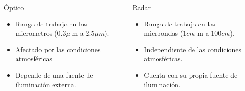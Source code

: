 \begin{frame}{} \vskip0cm
\begin{columns}
  \begin{column}{0.5\textwidth}
   \begin{block}{Óptico}
     \begin{itemize}
       \item Rango de trabajo en los micrometros ($0.3\mu$ m a $2.5\mu m$).
       \item Afectado por las condiciones atmosféricas.
       \item Depende de una fuente de iluminación externa.
     \end{itemize}
   \end{block}
  \end{column}
  \begin{column}{0.5\textwidth}  %
    \begin{block}{Radar}
      \begin{itemize}
        \item Rango de trabajo en los microondas ($1cm$ m a $100cm$).
        \item Independiente de las condiciones atmosféricas.
        \item Cuenta con su propia fuente de iluminación.
      \end{itemize}
    \end{block}
  \end{column}
  \end{columns}
\end{frame}

\gracias
